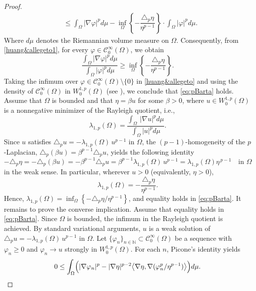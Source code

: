 \documentclass{article}
\begin{document}
\begin{proof}
\begin{equation}
\begin{aligned}
    &\leq \int_{\Omega} | \nabla \varphi |^p d\mu - \inf_{\Omega} \left\{-\dfrac{\triangle_p \eta}{\eta^{p-1}} \right\} \cdot \int_{\Omega}| \varphi|^pd\mu. 
    \end{aligned}
\end{equation}
Where $d\mu$ denotes the Riemannian volume measure on $\Omega$. Consequently, from \eqref{huang&allegeto1}, for every $\varphi \in \mathcal{C}_0^{\infty}(\Omega)$, we obtain
\begin{equation}\label{huang&allegeto}
   \dfrac{\displaystyle\int_{\Omega} | \nabla \varphi |^p d\mu}{\displaystyle\int_{\Omega}| \varphi|^pd\mu}\geq \inf_{\Omega} \left\{ -\frac{\triangle_p \eta}{\eta^{p-1}}  \right\}.
\end{equation}
Taking the infimum over $\varphi \in \mathcal{C}_0^\infty(\Omega)\setminus\{0\}$
in \eqref{huang&allegeto} and using the density of $\mathcal{C}_0^\infty(\Omega)$ in $W_0^{1,p}(\Omega)$ (see \cite[Corollary A.4]{le}), we conclude that \eqref{eq:pBarta} holds.
Assume that $\Omega$ is bounded and that $\eta=\beta u$ for some $\beta>0$,
where $u\in W_0^{1,p}(\Omega)$ is a nonnegative minimizer of the Rayleigh quotient, i.e.,
\[
\lambda_{1,p}(\Omega) =\frac{\displaystyle \int_\Omega \ |\nabla u|^pd\mu}{\displaystyle \int_\Omega |u|^p d\mu}.
\]
Since $u$ satisfies $\triangle_p u = -\lambda_{1,p}(\Omega)\,u^{p-1}$ in $\Omega$, the $(p-1)$-homogeneity of the $p$-Laplacian, $\triangle_p(\beta u)=\beta^{p-1}\triangle_p u$, yields the following identity
\[
-\triangle_p \eta
= -\triangle_p(\beta u)
= -\beta^{p-1}\triangle_p u
= \beta^{p-1}\lambda_{1,p}(\Omega)\,u^{p-1}
=\lambda_{1,p}(\Omega)\eta^{\,p-1}
\quad\text{in }\Omega
\]
in the weak sense. In particular, wherever $u>0$ (equivalently, $\eta>0$),
\[
\lambda_{1,p}(\Omega) = -\frac{\triangle_p\eta}{\eta^{p-1}}.
\]
Hence, $\lambda_{1,p}(\Omega) = \inf_\Omega\left\{-\triangle_p\eta/\eta^{p-1}\right\}$, and equality holds in \eqref{eq:pBarta}. It remains to prove the converse implication. Assume that equality holds in \eqref{eq:pBarta}. Since $\Omega$ is bounded, the infimum in the Rayleigh quotient is achieved. By standard variational arguments, $u$ is a weak solution of $\triangle_p u = -\lambda_{1,p}(\Omega)\,u^{p-1}$ in $\Omega$. Let $\{\varphi_n\}_{n\in\mathbb{N}}\subset \mathcal{C}_0^\infty(\Omega)$ be a sequence with $\varphi_n\ge0$ and
$\varphi_n\to u$ strongly in $W_0^{1,p}(\Omega)$. For each $n$, Picone's identity yields
\[
0\le \int_\Omega \Bigl(|\nabla \varphi_n|^p
-|\nabla \eta|^{p-2}\bigl\langle \nabla\eta,\nabla(\varphi_n^p/\eta^{p-1})\bigr\rangle\Bigr)d\mu.
\]
\end{proof}
\end{document}
